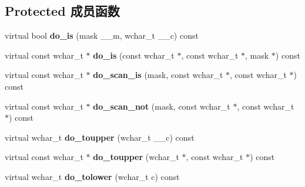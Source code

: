 \subsection*{Protected 成员函数}
\begin{DoxyCompactItemize}
\item 
\mbox{\label{classctype_3_01wchar__t_01_4_ae3f3d3a6159ff31fd79b913d2860b9cb}} 
virtual bool {\bfseries do\+\_\+is} (mask \+\_\+\+\_\+m, wchar\+\_\+t \+\_\+\+\_\+c) const
\item 
\mbox{\label{classctype_3_01wchar__t_01_4_ae2a65feebe54c5497abcf8d45088ef2d}} 
virtual const wchar\+\_\+t $\ast$ {\bfseries do\+\_\+is} (const wchar\+\_\+t $\ast$, const wchar\+\_\+t $\ast$, mask $\ast$) const
\item 
\mbox{\label{classctype_3_01wchar__t_01_4_a67c6c81f78d0aad2d5a8c397eed1b446}} 
virtual const wchar\+\_\+t $\ast$ {\bfseries do\+\_\+scan\+\_\+is} (mask, const wchar\+\_\+t $\ast$, const wchar\+\_\+t $\ast$) const
\item 
\mbox{\label{classctype_3_01wchar__t_01_4_a3eceeaa202320ec7c8e2ac4f7519505b}} 
virtual const wchar\+\_\+t $\ast$ {\bfseries do\+\_\+scan\+\_\+not} (mask, const wchar\+\_\+t $\ast$, const wchar\+\_\+t $\ast$) const
\item 
\mbox{\label{classctype_3_01wchar__t_01_4_ae624b1196d9b76f67aec3ab72b026604}} 
virtual wchar\+\_\+t {\bfseries do\+\_\+toupper} (wchar\+\_\+t \+\_\+\+\_\+c) const
\item 
\mbox{\label{classctype_3_01wchar__t_01_4_a82d107128810c192ca536b52c8eb8891}} 
virtual const wchar\+\_\+t $\ast$ {\bfseries do\+\_\+toupper} (wchar\+\_\+t $\ast$, const wchar\+\_\+t $\ast$) const
\item 
\mbox{\label{classctype_3_01wchar__t_01_4_a6cde78475f78b1b788a75d6717fed5a7}} 
virtual wchar\+\_\+t {\bfseries do\+\_\+tolower} (wchar\+\_\+t c) const
\item 
\mbox{\label{classctype_3_01wchar__t_01_4_a0ebd60f97d0e73f7938710165c6b95a8}} 

\end{DoxyCompactItemize}
